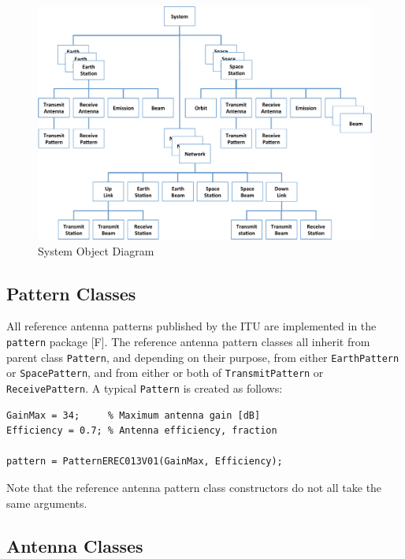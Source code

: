\documentclass[11pt]{article}
\begin{document}
\begin{landscape}
  \begin{figure}
    \begin{center}
      \includegraphics[width=7.0in]{figure-system-object-diagram.pdf}
    \end{center}
    \caption{System Object Diagram}\label{figure-system-object-diagram}
  \end{figure}
\end{landscape}

\subsection{Pattern Classes}

All reference antenna patterns published by the ITU are implemented in
the \texttt{\small pattern} package [F]. The reference antenna pattern
classes all inherit from parent class \texttt{\small Pattern}, and
depending on their purpose, from either \texttt{\small EarthPattern}
or \texttt{\small SpacePattern}, and from either or both of
\texttt{\small TransmitPattern} or \texttt{\small ReceivePattern}. A
typical \texttt{\small Pattern} is created as follows:
{\small
\begin{verbatim}
GainMax = 34;     % Maximum antenna gain [dB]
Efficiency = 0.7; % Antenna efficiency, fraction

pattern = PatternEREC013V01(GainMax, Efficiency);
\end{verbatim}
}
\noindent Note that the reference antenna pattern class constructors
do not all take the same arguments.

\subsection{Antenna Classes}
\end{document}

